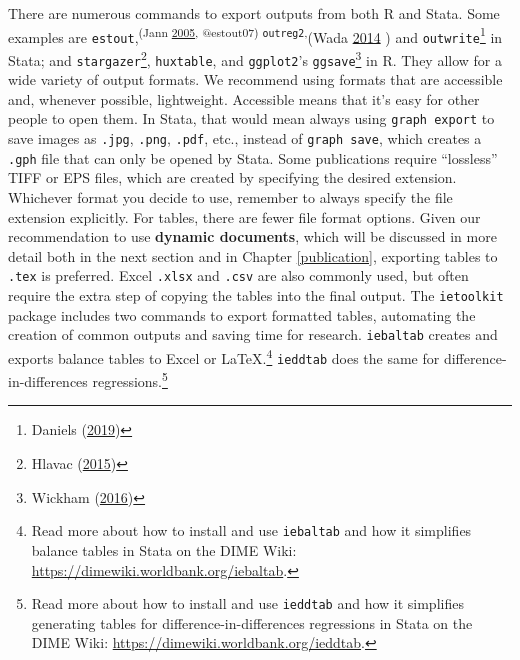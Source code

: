 \documentclass[
]{book}
\begin{document}
There are numerous commands to export outputs from both R and Stata.
Some examples are \texttt{estout},\textsuperscript{(Jann \protect\hyperlink{ref-estout05}{2005}, @estout07)
\texttt{outreg2},}(Wada \protect\hyperlink{ref-wada2014outreg2}{2014} )
and \texttt{outwrite}\footnote{Daniels (\protect\hyperlink{ref-daniels2019outwrite}{2019})} in Stata;
and \texttt{stargazer}\footnote{Hlavac (\protect\hyperlink{ref-hlavac2015stargazer}{2015})},
\texttt{huxtable},
and \texttt{ggplot2}'s \texttt{ggsave}\footnote{Wickham (\protect\hyperlink{ref-ggplot2}{2016})}
in R.
They allow for a wide variety of output formats.
We recommend using formats that are accessible and, whenever possible, lightweight.
Accessible means that it's easy for other people to open them.
In Stata, that would mean always using \texttt{graph\ export} to save images as
\texttt{.jpg}, \texttt{.png}, \texttt{.pdf}, etc.,
instead of \texttt{graph\ save},
which creates a \texttt{.gph} file that can only be opened by Stata.
Some publications require ``lossless'' TIFF or EPS files,
which are created by specifying the desired extension.
Whichever format you decide to use,
remember to always specify the file extension explicitly.
For tables, there are fewer file format options.
Given our recommendation to use \textbf{dynamic documents},
which will be discussed in more detail both in the next section and in Chapter \ref{publication},
exporting tables to \texttt{.tex} is preferred.
Excel \texttt{.xlsx} and \texttt{.csv} are also commonly used,
but often require the extra step of copying the tables into the final output.
The \texttt{ietoolkit} package includes two commands to export formatted tables,
automating the creation of common outputs and saving time for research.
\texttt{iebaltab} creates and exports balance tables to Excel or LaTeX.\footnote{Read more about how to install and use \texttt{iebaltab}
  and how it simplifies balance tables in Stata on the DIME Wiki:
  \url{https://dimewiki.worldbank.org/iebaltab}.}
\texttt{ieddtab} does the same for difference-in-differences regressions.\footnote{Read more about how to install and use \texttt{ieddtab}
  and how it simplifies generating tables for difference-in-differences regressions
  in Stata on the DIME Wiki:
  \url{https://dimewiki.worldbank.org/ieddtab}.}
\end{document}
